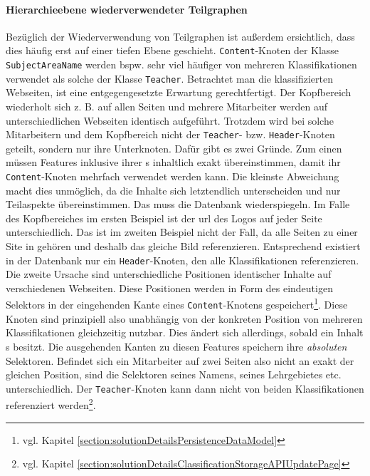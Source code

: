     \paragraph{Hierarchieebene wiederverwendeter Teilgraphen}
    Bezüglich der Wiederverwendung von Teilgraphen ist außerdem ersichtlich,
    dass dies häufig erst auf einer tiefen Ebene geschieht.
    \texttt{Content}-Knoten der Klasse \texttt{SubjectAreaName} werden bspw.
    sehr viel häufiger von mehreren Klassifikationen verwendet als solche der
    Klasse \texttt{Teacher}.
    Betrachtet man die klassifizierten Webseiten,
    ist eine entgegengesetzte Erwartung gerechtfertigt.
    Der Kopfbereich wiederholt sich z. B. auf allen Seiten
    und mehrere Mitarbeiter werden auf unterschiedlichen Webseiten identisch aufgeführt.
    Trotzdem wird bei solche Mitarbeitern und dem Kopfbereich
    nicht der \texttt{Teacher}- bzw. \texttt{Header}-Knoten geteilt,
    sondern nur ihre Unterknoten.
    Dafür gibt es zwei Gründe.
    Zum einen müssen Features inklusive ihrer {\childFeature}s inhaltlich
    exakt übereinstimmen, damit ihr \texttt{Content}-Knoten mehrfach verwendet werden kann.
    Die kleinste Abweichung macht dies unmöglich,
    da die Inhalte sich letztendlich unterscheiden und nur Teilaspekte übereinstimmen.
    Das muss die Datenbank wiederspiegeln.
    Im Falle des Kopfbereiches im ersten Beispiel ist der \gls{url} des Logos
    auf jeder Seite unterschiedlich.
    Das ist im zweiten Beispiel nicht der Fall,
    da alle Seiten zu einer Site in {\wordpress} gehören
    und deshalb das gleiche Bild referenzieren.
    Entsprechend existiert in der Datenbank nur ein \texttt{Header}-Knoten,
    den alle Klassifikationen referenzieren.
    Die zweite Ursache sind unterschiedliche Positionen identischer Inhalte
    auf verschiedenen Webseiten.
    Diese Positionen werden in Form des eindeutigen Selektors in der eingehenden
    Kante eines \texttt{Content}-Knotens gespeichert\footnote{vgl. Kapitel \ref{section:solutionDetailsPersistenceDataModel}}.
    Diese Knoten sind prinzipiell also unabhängig von der konkreten Position
    von mehreren Klassifikationen gleichzeitig nutzbar.
    Dies ändert sich allerdings, sobald ein Inhalt {\childFeature}s besitzt.
    Die ausgehenden Kanten zu diesen Features speichern ihre \textit{absoluten} Selektoren.
    Befindet sich ein Mitarbeiter auf zwei Seiten also nicht an exakt der gleichen Position,
    sind die Selektoren seines Namens, seines Lehrgebietes etc. unterschiedlich.
    Der \texttt{Teacher}-Knoten kann dann nicht von beiden Klassifikationen referenziert
    werden\footnote{vgl. Kapitel \ref{section:solutionDetailsClassificationStorageAPIUpdatePage}}.
    
